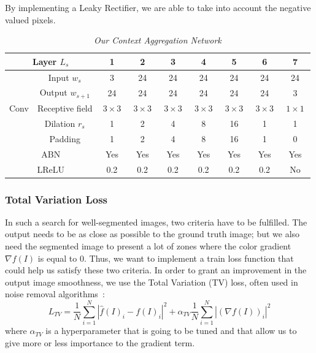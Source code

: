 \documentclass{article}
\begin{document}
            \noindent By implementing a Leaky Rectifier, we are able to take into account the negative valued pixels.

            \begin{table}[!ht]
                \centering
                \begin{tabular}{|c|c||c|cccc|cc|}
                    \hline
                    \multicolumn{2}{|c||}{Layer $L_s$} & 1 & 2 & 3 & 4 & 5 & 6 & 7 \\
                    \hline
                    \hline
                     & Input $w_s$ & 3 & 24 & 24 & 24 & 24 & 24 & 24 \\
                     & Output $w_{s+1}$ & 24 & 24 & 24 & 24 & 24 & 24 & 3 \\
                    \cline{2-9}
                    Conv & Receptive field & $\ 3\times 3\ $ & $\ 3\times 3\ $ & $\ 3\times 3\ $ & $\ 3\times 3\ $ & $\ 3\times 3\ $ & $\ 3\times 3\ $ & $\ 1\times 1\ $ \\
                     & Dilation $r_s$ & 1 & 2 & 4 & 8 & 16 & 1 & 1 \\
                     & Padding & 1 & 2 & 4 & 8 & 16 & 1 & 0 \\
                    \hline
                    \multicolumn{2}{|c||}{ABN} & Yes & Yes & Yes & Yes & Yes & Yes & Yes \\
                    \hline
                    \multicolumn{2}{|c||}{LReLU} & 0.2 & 0.2 & 0.2 & 0.2 & 0.2 & 0.2 & No \\
                    \hline
                \end{tabular}
                \caption{\textit{Our Context Aggregation Network}}
            \end{table}


        \subsubsection{Total Variation Loss}
            In such a search for well-segmented images, two criteria have to be fulfilled. The output needs to be as close as possible to the ground truth image; but we also need the segmented image to present a lot of zones where the color gradient $\nabla f(I)$ is equal to $0$. Thus, we want to implement a train loss function that could help us satisfy these two criteria.
            In order to grant an improvement in the output image smoothness, we use the Total Variation (TV) loss, often used in noise removal algorithms~\cite{rudin1992,chambolle2004}:
            $$
            L_{TV}=\frac{1}{N}\sum_{i=1}^N |\hat{f}(I)_i-f(I)_i|^2+\alpha_{TV}\frac{1}{N}\sum_{i=1}^N|(\nabla f(I))_i|^2
            $$
            where $\alpha_{TV}$ is a hyperparameter that is going to be tuned and that allow us to give more or less importance to the gradient term.
\end{document}
